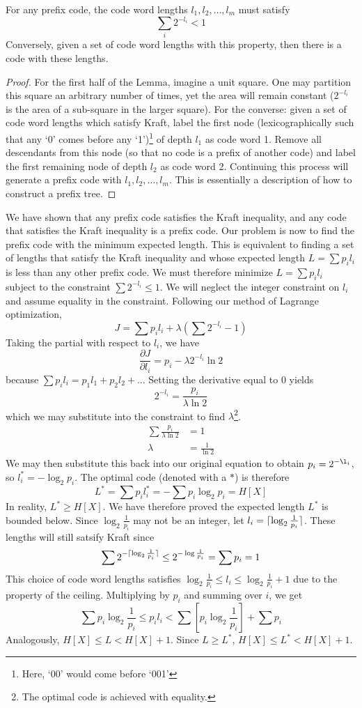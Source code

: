 \documentclass[11pt]{article}
\DeclarePairedDelimiter{\ceil}{\lceil}{\rceil}
\theoremstyle{definition}
\begin{document}
 For any prefix code, the code word lengths $l_1, l_2, \dots, l_m$ must satisfy $$\sum_i 2^{-l_i}  < 1$$Conversely, given a set of code word lengths with this property, then there is a code with these lengths. 
\begin{proof}
For the first half of the Lemma, imagine a unit square. One may partition this square an arbitrary number of times, yet the area will remain constant ($2^{-l_i}$ is the area of a sub-square in the larger square). For the converse: given a set of code word lengths which satisfy Kraft, label the first node (lexicographically such that any `0' comes before any `1')\footnote{Here, `00' would come before `001'} of depth $l_1$ as code word 1. Remove all descendants from this node (so that no code is a prefix of another code) and label the first remaining node of depth $l_2$ as code word 2. Continuing this process will generate a prefix code with $l_1, l_2, \dots, l_m$. This is essentially a description of how to construct a prefix tree. 
\end{proof}

We have shown that any prefix code satisfies the Kraft inequality, and any code that satisfies the Kraft inequality is a prefix code. Our problem is now to find the prefix code with the minimum expected length.  This is equivalent to finding a set of lengths that satisfy the Kraft inequality and whose expected length $L = \sum p_i l_i$ is less than any other prefix code. We must therefore minimize $L  = \sum p_i l_i$ subject to the constraint $\sum 2^{-l_i} \leq 1$. We will neglect the integer constraint on $l_i$ and assume equality in the constraint. Following our method of Lagrange optimization, $$J = \sum p_i l_i + \lambda(\sum 2^{-l_i} -1)$$
Taking the partial with respect to $l_i$, we have $$\frac{\partial J}{\partial l_i} = p_i - \lambda 2^{- l_i} \ln 2$$because $\sum p_i l_i = p_1 l_1 + p_2 l_2 + \dots$ Setting the derivative equal to 0 yields $$2^{-l_i} = \frac{p_i}{\lambda \ln 2}$$which we may substitute into the constraint to find $\lambda$\footnote{The optimal code is achieved with equality.}.
\begin{align*}
\sum \frac{p_i}{\lambda \ln 2} &= 1 \\
\lambda &= \frac{1}{\ln 2}
\end{align*} 
We may then substitute this back into our original equation to obtain $p_i = 2^{- \l_i}$, so $l_i^* = -\log_2 p_i$. The optimal code (denoted with a $*$) is therefore $$L^* = \sum p_i l_i^* = -\sum p_i \log_2 p_i = H[X]$$In reality, $L^* \geq H[X]$. We have therefore proved the expected length $L^*$ is bounded below.  Since $\log_2 \frac{1}{p_i}$ may not be an integer, let $l_i = \ceil{\log_2 \frac{1}{p_i}}$. These lengths will still satsify Kraft since $$\sum 2^{-\ceil{\log_2 \frac{1}{p_i}}} \leq 2^{-\log \frac{1}{p_i}} = \sum p_i = 1$$This choice of code word lengths satisfies $\log_2 \frac{1}{p_i} \leq l_i \leq \log_2 \frac{1}{p_i} + 1$ due to the property of the ceiling. Multiplying by $p_i$ and summing over $i$, we get $$\sum p_i \log_2 \frac{1}{p_i} \leq p_i l_i < \sum \left[p_i \log_2 \frac{1}{p_i}\right] + \sum p_i$$Analogously, $H[X] \leq L < H[X] + 1$. Since $L \geq L^*$, $H[X] \leq L^* < H[X] + 1$. 
\end{document}
